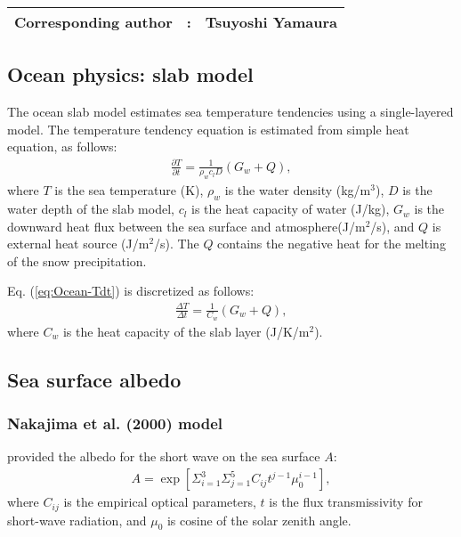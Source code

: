 {\bf \Large 
\begin{tabular}{ccc}
\hline
  Corresponding author & : & Tsuyoshi Yamaura\\
\hline
\end{tabular}
}


\subsection{Ocean physics: slab model}

The ocean slab model estimates sea temperature tendencies using a single-layered model.
The temperature tendency equation is estimated from simple heat equation, as follows:
\begin{align}
  \frac{\partial T}{\partial t} = \frac{1}{\rho_{w}c_{l}D} \left( G_{w} + Q \right),
  \label{eq:Ocean-Tdt}
\end{align}
where
$T$ is the sea temperature (K),
$\rho_{w}$ is the water density (kg/m$^3$),
$D$ is the water depth of the slab model,
$c_l$ is the heat capacity of water (J/kg),
$G_{w}$ is the downward heat flux between the sea surface and atmosphere(J/m$^2$/s),
and $Q$ is external heat source (J/m$^2$/s).
The $Q$ contains the negative heat for the melting of the snow precipitation.

Eq. (\ref{eq:Ocean-Tdt}) is discretized as follows:
\begin{align}
  \frac{\Delta T}{\Delta t} = \frac{1}{C_{w}} \left( G_{w} + Q \right),
\end{align}
where
$C_{w}$ is the heat capacity of the slab layer (J/K/m$^2$).

\subsection{Sea surface albedo}
\subsubsection{Nakajima et al. (2000) model}
\citet{nakajima_2000} provided the albedo for the short wave on the sea surface $A$:
\begin{align}
  A = \exp \left[ \Sigma_{i=1}^{3} \Sigma_{j=1}^{5} C_{ij} t^{j-1} \mu_0^{i-1} \right],
\end{align}
where
$C_{ij}$ is the empirical optical parameters,
$t$ is the flux transmissivity for short-wave radiation,
and $\mu_0$ is cosine of the solar zenith angle.


